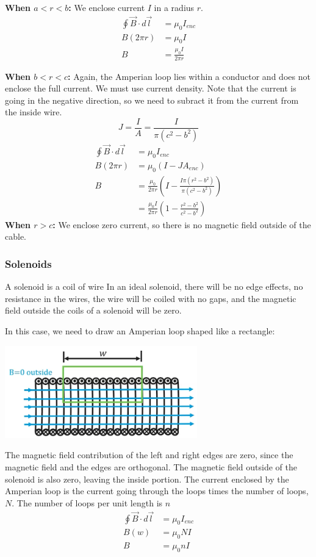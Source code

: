 \documentclass[12pt, titlepage]{article}
\begin{document}
\textbf{When $a<r<b$:} We enclose current $I$ in a radius $r$.
\begin{align*}
    \oint \vec{B} \cdot d\vec{l} &= \mu_0I_{enc} \\
    B(2\pi r) &= \mu_0 I \\
    B &= \boxed{\frac{\mu_0 I}{2\pi r}}
\end{align*}

\textbf{When $b<r<c$:} Again, the Amperian loop lies within a conductor and does not enclose the full current. We must use current density. Note that the current is going in the negative direction, so we need to subract it from the current from the inside wire.
\begin{equation*}
    J=\frac{I}{A}=\frac{I}{\pi(c^2-b^2)}
\end{equation*}
\begin{align*}
    \oint \vec{B} \cdot d\vec{l} &= \mu_0I_{enc} \\
    B(2\pi r) &= \mu_0 (I-JA_{enc}) \\
    B &= \frac{\mu_0}{2 \pi r} (I- \frac{I\pi (r^2-b^2)}{\pi (c^2-b^2)}) \\
    &= \boxed{\frac{\mu_0I}{2 \pi r}(1-\frac{r^2-b^2}{c^2-b^2})}
\end{align*}
\textbf{When $r>c$:} We enclose zero current, so there is no magnetic field outside of the cable.

\subsubsection*{Solenoids}

A solenoid is a coil of wire In an ideal solenoid, there will be no edge effects, no resistance in the wires, the wire will be coiled with no gaps, and the magnetic field outside the coils of a solenoid will be zero. 

In this case, we need to draw an Amperian loop shaped like a rectangle:
\begin{center}
    \includegraphics*[height=4cm]{media/solenoid.png}
\end{center}
The magnetic field contribution of the left and right edges are zero, since the magnetic field and the edges are orthogonal. The magnetic field outside of the solenoid is also zero, leaving the inside portion. The current enclosed by the Amperian loop is the current going through the loops times the number of loops, $N$. The number of loops per unit length is $n$
\begin{align*}
    \oint \vec{B} \cdot d\vec{l} &= \mu_0I_{enc} \\
    B(w) &= \mu_0NI \\
    B &= \boxed{\mu_0nI}
\end{align*}
\end{document}
